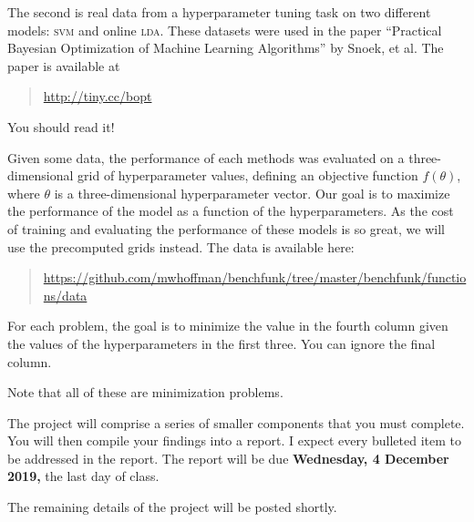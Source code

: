 \documentclass{article}
\newcommand{\acro}[1]{\textsc{\MakeLowercase{#1}}}
\begin{document}
The second is real data from a hyperparameter tuning task on two
different models: \acro{SVM} and online \acro{LDA}. These datasets
were used in the paper ``Practical Bayesian Optimization of Machine
Learning Algorithms'' by Snoek, et al. The paper is available at
\begin{quote}
  \url{http://tiny.cc/bopt}
\end{quote}
You should read it!

Given some data, the performance of each methods was evaluated on a
three-dimensional grid of hyperparameter values, defining an objective
function $f(\theta)$, where $\theta$ is a three-dimensional
hyperparameter vector. Our goal is to maximize the performance of the
model as a function of the hyperparameters.  As the cost of training
and evaluating the performance of these models is so great, we will
use the precomputed grids instead. The data is available here:
\begin{quote}
  \url{https://github.com/mwhoffman/benchfunk/tree/master/benchfunk/functions/data}
\end{quote}
For each problem, the goal is to minimize the value in the fourth
column given the values of the hyperparameters in the first three. You
can ignore the final column.

Note that all of these are minimization problems.

The project will comprise a series of smaller components that you must
complete. You will then compile your findings into a report. I expect
every bulleted item to be addressed in the report. The report will
be due \textbf{Wednesday, 4 December 2019,} the last day of class.

The remaining details of the project will be posted shortly.
\end{document}
